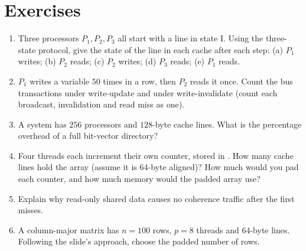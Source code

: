 \section*{Exercises}
\begin{enumerate}[label=\textbf{\thechapter.\arabic*},leftmargin=*]
  \item Three processors $P_1,P_2,P_3$ all start with a line in state I. Using the three-state protocol, give the state of the line in each
        cache after each step: (a) $P_1$ writes; (b) $P_2$ reads; (c) $P_2$ writes; (d) $P_3$ reads; (e) $P_1$ reads.
  \item $P_1$ writes a variable $50$ times in a row, then $P_2$ reads it once. Count the bus transactions under write-update
        and under write-invalidate (count each broadcast, invalidation and read miss as one).
  \item A system has $256$ processors and $128$-byte cache lines. What is the percentage overhead of a full bit-vector directory?
  \item Four threads each increment their own  counter, stored in . How many cache lines hold the array
        (assume it is $64$-byte aligned)? How much would you pad each counter, and how much memory would the padded array use?
  \item Explain why read-only shared data causes no coherence traffic after the first misses.
  \item A column-major matrix has $n=100$ rows, $p=8$ threads and $64$-byte lines. Following the slide's approach,
        choose the padded number of rows.
\end{enumerate}